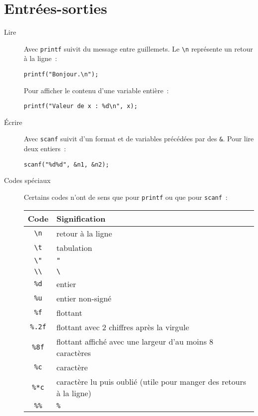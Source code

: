 \documentclass[a4paper,10pt]{article}
\begin{document}
  \section{Entrées-sorties}
  \begin{description}
    \item[Lire] Avec \texttt{printf} suivit du message entre guillemets. Le \texttt{\textbackslash n} représente un retour à la ligne~:
      \begin{verbatim}
printf("Bonjour.\n");
      \end{verbatim}
      Pour afficher le contenu d'une variable entière~:
      \begin{verbatim}
printf("Valeur de x : %d\n", x);
      \end{verbatim}
    \item[Écrire] Avec \texttt{scanf} suivit d'un format et de variables précédées par des \texttt{\&}. Pour lire deux entiers~:
      \begin{verbatim}
scanf("%d%d", &n1, &n2);
      \end{verbatim}
    \item[Codes spéciaux] Certains codes n'ont de sens que pour \texttt{printf} ou que pour \texttt{scanf}~:\\
      \begin{tabu}{c|l}
        Code & Signification\\
        \hline
        \texttt{\textbackslash n} & retour à la ligne\\
        \texttt{\textbackslash t} & tabulation\\
        \texttt{\textbackslash "} & \texttt{"}\\
        \texttt{\textbackslash \textbackslash} & \texttt{\textbackslash}\\
        \hline
        \texttt{\%d} & entier\\
        \texttt{\%u} & entier non-signé\\
        \texttt{\%f} & flottant\\
        \texttt{\%.2f} & flottant avec 2 chiffres après la virgule\\
        \texttt{\%8f} & flottant affiché avec une largeur d'au moins 8 caractères\\
        \texttt{\%c} & caractère\\
        \texttt{\%*c} & caractère lu puis oublié (utile pour manger des retours à la ligne)\\
        \texttt{\%\%} & \texttt{\%}\\
      \end{tabu}
  \end{description}
\end{document}
